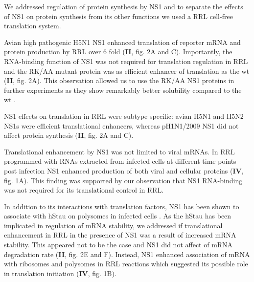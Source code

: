 		We addressed regulation of protein synthesis by NS1 and to separate the effects of NS1 on protein synthesis from its other functions we used a \gls{RRL} cell-free translation system. 
		
		Avian high pathogenic H5N1 NS1 enhanced translation of reporter mRNA and protein production by \gls{RRL} over 6 fold (\textbf{II}, fig. 2A and C). Importantly, the RNA-binding function of NS1 was not required for translation regulation in \gls{RRL} and the RK/AA mutant protein was as efficient enhancer of translation as the \gls{wt} (\textbf{II}, fig. 2A). This observation allowed us to use the RK/AA NS1 proteins in further experiments as they show remarkably better solubility compared to the \gls{wt} \parencite{Bornholdt2008}. 
		
		NS1 effects on translation in \gls{RRL} were subtype specific: avian H5N1 and H5N2 NS1s were efficient translational enhancers, whereas pH1N1/2009 NS1 did not affect protein synthesis (\textbf{II}, fig. 2A and C). 
		
		Translational enhancement by NS1 was not limited to viral mRNAs. In \gls{RRL} programmed with RNAs extracted from infected cells at different time points post infection NS1 enhanced production of both viral and cellular proteins (\textbf{IV}, fig. 1A). This finding was supported by  our observation that NS1 RNA-binding was not required for its translational control in \gls{RRL}. 
		
		In addition to its interactions with translation factors, NS1 has been shown to associate with \gls{hStau} on polysomes in infected cells \parencite{Falcon1999}. As the \gls{hStau} has been implicated in regulation of mRNA stability, we addressed if translational enhancement in \gls{RRL} in the presence of \gls{NS1} was a result of increased mRNA stability. This appeared not to be the case and NS1 did not affect of mRNA degradation rate (\textbf{II}, fig. 2E and F). Instead, NS1 enhanced association of mRNA with ribosomes and polysomes in RRL reactions which suggested its possible role in translation initiation (\textbf{IV}, fig. 1B).
		
